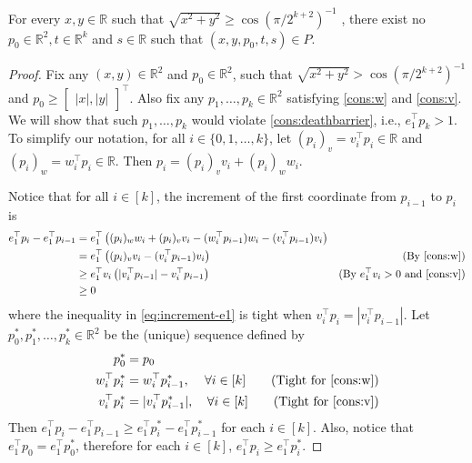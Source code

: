 \documentclass{theoretics}
\newcommand{\R}{\mathbb R}
\begin{document}
\begin{lemma}\label{lem:outerdisk}
For every $x,y \in \R$ such that $\sqrt{x^2+y^2} \geq \cos(\pi/2^{k+2})^{-1}$ , there exist no
$p_0 \in \R^2, t \in \R^k$ and $s \in \R$ such that $(x,y,p_0,t,s) \in P$.
\end{lemma}
\begin{proof}
Fix any $(x, y) \in \R^2$ and $p_0 \in \R^2$, such that $\sqrt{x^2 + y^2} > \cos(\pi/2^{k+2})^{-1}$ and $p_0 \geq \begin{bmatrix}|x|, |y| \end{bmatrix}^\top$. 
Also fix any $p_1, \ldots, p_k \in \R^2$ satisfying \eqref{cons:w} and \eqref{cons:v}. We will show that such $p_1, \ldots, p_k$ would violate \eqref{cons:deathbarrier}, i.e., $e_1^\top p_k > 1$.  To simplify our notation, for all $i \in \{0, 1, \ldots, k\}$, let $(p_i)_v = v_i^\top p_i \in \R$ and $(p_i)_w = w_i^\top p_i \in \R$. Then $p_i = (p_i)_v v_i + (p_i)_w w_i$.

Notice that for all $i \in [k]$, the increment of the first coordinate from $p_{i-1}$ to $p_i$ is
\begin{align}\label{eq:increment-e1}
    e_1^\top p_i - e_1^\top p_{i-1} &= e_1^\top \left( (p_i)_w w_i + (p_i)_v v_i - (w_i^\top p_{i-1})w_i - (v_i^\top p_{i-1})v_i  \right) \nonumber \\
    &= e_1^\top \left( (p_i)_v v_i - (v_i^\top p_{i-1})v_i  \right) & (\text{By \eqref{cons:w}}) \nonumber \\
    &\geq e_1^\top v_i \left( |v_i^\top p_{i-1}| - v_i^\top p_{i-1} \right) & (\text{By $e_1^\top v_i > 0$ and \eqref{cons:v}}) \\
    &\geq 0 \nonumber
\end{align}
where the inequality in \eqref{eq:increment-e1} is tight when $v_i^\top p_i = |v_i^\top p_{i-1}|$.
Let $p_0^*, p_1^*, \ldots, p_k^*\in\R^2$ be the (unique) sequence defined by
\begin{align*}
    p_0^* &= p_0 \\
    w_i^\top p_i^* &= w_i^\top p_{i-1}^*, & \forall i\in [k] \tag{Tight for \eqref{cons:w}} \\
    v_i^\top p_i^* &= |v_i^\top p_{i-1}^*|, & \forall i\in [k] \tag{Tight for \eqref{cons:v}}
\end{align*}
Then $e_1^\top p_i - e_1^\top p_{i-1} \geq e_1^\top p_i^* - e_1^\top p_{i-1}^*$ for each $i \in [k]$. Also, notice that $e_1^\top p_0 = e_1^\top p_0^*$, therefore for each $i \in [k]$, $e_1^\top p_i \geq e_1^\top p_i^*$.


\end{proof}
\end{document}
